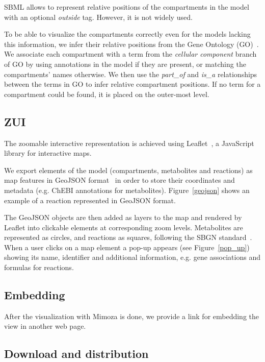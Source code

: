 \documentclass{bmcart}
\begin{document}
SBML allows to represent relative positions of the compartments in the model with an optional \emph{outside} tag. However, it is not widely used.

To be able to visualize the compartments correctly even for the models lacking this information, we infer their relative positions from the Gene Ontology (GO)~\cite{Ashburner2000}. We associate each compartment with a term from the \emph{cellular component} branch of GO by using annotations in the model if they are present, or matching the compartments' names otherwise. We then use the \emph{part\_of} and \emph{is\_a} relationships between the terms in GO to infer relative compartment positions. If no term for a compartment could be found, it is placed on the outer-most level. 
 
\subsection*{ZUI}

The zoomable interactive representation is achieved using Leaflet~\cite{Agafonkin}, a JavaScript library for interactive maps. 

We export elements of the model (compartments, metabolites and reactions) as map features in GeoJSON format~\cite{Butler} in order to store their coordinates and metadata (e.g. ChEBI annotations for metabolites). Figure~\ref{geojson} shows an example of a reaction represented in GeoJSON format. 

The GeoJSON objects are then added as layers to the map and rendered by Leaflet into clickable elements at corresponding zoom levels. Metabolites are represented as circles, and reactions as squares, following the SBGN standard~\cite{LeNovere2009}.  When a user clicks on a map element a pop-up appears (see Figure~\ref{pop_up}) showing its name, identifier and additional information, e.g. gene associations and formulas for reactions.
 

\subsection*{Embedding}
After the visualization with Mimoza is done, we provide a link for embedding the view in another web page.

\subsection*{Download and distribution}
\end{document}
